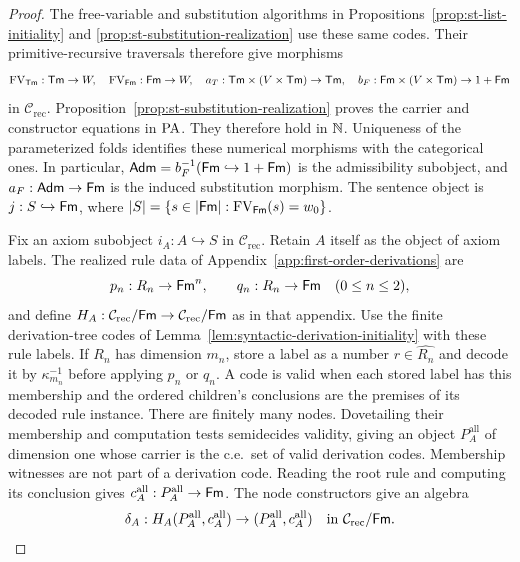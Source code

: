 \begin{proof}
The free-variable and substitution algorithms in
Propositions~\ref{prop:st-list-initiality} and
\ref{prop:st-substitution-realization} use these same codes.
Their primitive-recursive traversals therefore give morphisms
\[
 \operatorname{FV}_{\mathsf{Tm}}:\mathsf{Tm}\to W,\quad \operatorname{FV}_{\mathsf{Fm}}:\mathsf{Fm}\to W,\quad
 a_T:\mathsf{Tm}\times(V\times\mathsf{Tm})\to\mathsf{Tm},\quad
 b_F:\mathsf{Fm}\times(V\times\mathsf{Tm})\to1+\mathsf{Fm}
\]
in $\mathcal C_{\mathrm{rec}}$.
Proposition~\ref{prop:st-substitution-realization}
proves the carrier and constructor equations in $\mathrm{PA}$.
They therefore hold in $\mathbb N$. Uniqueness of the parameterized folds
identifies these numerical morphisms with the categorical ones.
In particular,
$\mathsf{Adm}=b_F^{-1}(\mathsf{Fm}\hookrightarrow1+\mathsf{Fm})$ is the admissibility
subobject, and $a_F:\mathsf{Adm}\to\mathsf{Fm}$ is the induced substitution
morphism. The sentence object is
$j:S\hookrightarrow\mathsf{Fm}$, where
$|S|=\{s\in|\mathsf{Fm}|:\operatorname{FV}_{\mathsf{Fm}}(s)=w_0\}$.

Fix an axiom subobject $i_A:A\hookrightarrow S$ in
$\mathcal C_{\mathrm{rec}}$. Retain $A$ itself as the object of axiom labels. The realized
rule data of Appendix~\ref{app:first-order-derivations} are
\[
 p_n:R_n\to\mathsf{Fm}^n,\qquad q_n:R_n\to\mathsf{Fm}\quad(0\le n\le2),
\]
and define
$H_A:\mathcal C_{\mathrm{rec}}/\mathsf{Fm}\to
\mathcal C_{\mathrm{rec}}/\mathsf{Fm}$ as in that appendix.
Use the finite derivation-tree codes of
Lemma~\ref{lem:syntactic-derivation-initiality} with these rule labels.
If $R_n$ has dimension $m_n$, store a label as a number
$r\in\widehat{R_n}$ and decode it by $\kappa_{m_n}^{-1}$
before applying $p_n$ or $q_n$. A code is valid when each stored
label has this membership and the ordered children's conclusions
are the premises of its decoded rule instance.
There are finitely many nodes. Dovetailing their membership and
computation tests semidecides validity, giving an object
$P_A^{\mathrm{all}}$ of dimension one whose carrier is the
c.e.\ set of valid derivation codes. Membership witnesses are not part of a
derivation code. Reading the root rule and computing its conclusion
gives $c_A^{\mathrm{all}}:P_A^{\mathrm{all}}\to\mathsf{Fm}$.
The node constructors give an algebra
\[
 \delta_A:H_A(P_A^{\mathrm{all}},c_A^{\mathrm{all}})
           \to(P_A^{\mathrm{all}},c_A^{\mathrm{all}})
 \quad\text{in }\mathcal C_{\mathrm{rec}}/\mathsf{Fm}.
\]


\end{proof}
